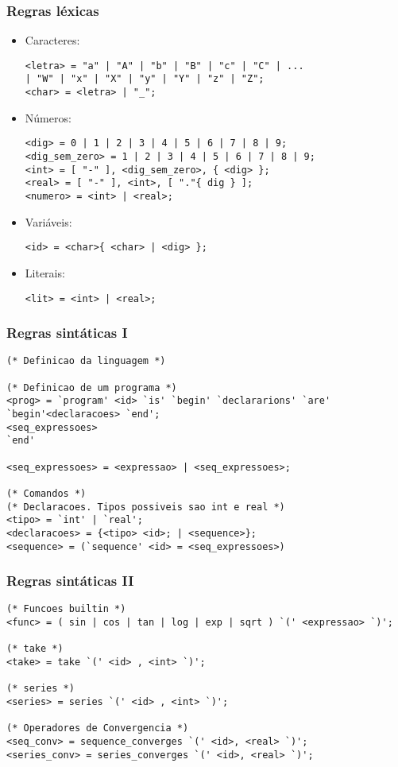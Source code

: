 \documentclass{beamer}
\begin{document}
\begin{frame}[fragile]
  \frametitle{Regras l\'exicas}

\begin{itemize}
\item Caracteres:
\begin{verbatim}
<letra> = "a" | "A" | "b" | "B" | "c" | "C" | ...
| "W" | "x" | "X" | "y" | "Y" | "z" | "Z";
<char> = <letra> | "_";
\end{verbatim}
\item N\'umeros:
\begin{verbatim}
<dig> = 0 | 1 | 2 | 3 | 4 | 5 | 6 | 7 | 8 | 9;
<dig_sem_zero> = 1 | 2 | 3 | 4 | 5 | 6 | 7 | 8 | 9;
<int> = [ "-" ], <dig_sem_zero>, { <dig> };
<real> = [ "-" ], <int>, [ "."{ dig } ];
<numero> = <int> | <real>;
\end{verbatim}

\item Vari\'aveis:
\begin{verbatim}
<id> = <char>{ <char> | <dig> };
\end{verbatim}

\item Literais:
\begin{verbatim}
<lit> = <int> | <real>;
\end{verbatim}
\end{itemize}
\end{frame}

\begin{frame}[fragile]
\frametitle{Regras sint\'aticas I}
\begin{verbatim}
(* Definicao da linguagem *)

(* Definicao de um programa *)
<prog> = `program' <id> `is' `begin' `declararions' `are'
`begin'<declaracoes> `end';
<seq_expressoes>
`end'

<seq_expressoes> = <expressao> | <seq_expressoes>;

(* Comandos *)
(* Declaracoes. Tipos possiveis sao int e real *)
<tipo> = `int' | `real';
<declaracoes> = {<tipo> <id>; | <sequence>};
<sequence> = (`sequence' <id> = <seq_expressoes>)
\end{verbatim}
\end{frame}

\begin{frame}[fragile]
\frametitle{Regras sint\'aticas II}
\begin{verbatim}
(* Funcoes builtin *)
<func> = ( sin | cos | tan | log | exp | sqrt ) `(' <expressao> `)';

(* take *)
<take> = take `(' <id> , <int> `)';

(* series *)
<series> = series `(' <id> , <int> `)';

(* Operadores de Convergencia *)
<seq_conv> = sequence_converges `(' <id>, <real> `)';
<series_conv> = series_converges `(' <id>, <real> `)';
\end{verbatim}
\end{frame}
\end{document}
